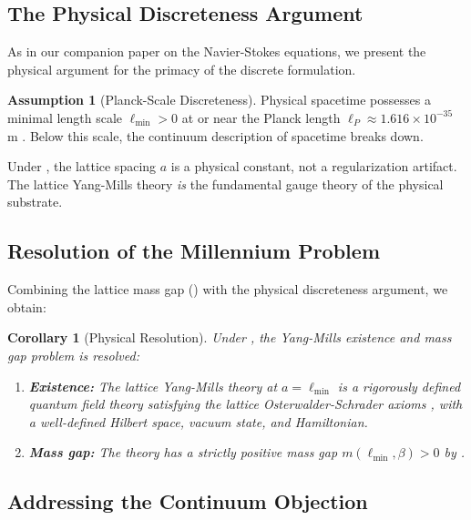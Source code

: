 \documentclass[12pt, a4paper]{article}
\theoremstyle{plain}
\newtheorem{corollary}[theorem]{Corollary}
\theoremstyle{definition}
\newtheorem{assumption}[theorem]{Assumption}
\begin{document}
\subsection{The Physical Discreteness Argument}

As in our companion paper on the Navier-Stokes equations, we present the
physical argument for the primacy of the discrete formulation.

\begin{assumption}[Planck-Scale Discreteness]\label{asm:planck}
  Physical spacetime possesses a minimal length scale $\ell_{\min} > 0$
  at or near the Planck length $\ell_P \approx 1.616 \times 10^{-35}$ m
  \citep{Planck1899, Rovelli2004}. Below this scale, the continuum
  description of spacetime breaks down.
\end{assumption}

Under , the lattice spacing $a$ is a physical constant,
not a regularization artifact. The lattice Yang-Mills theory \emph{is}
the fundamental gauge theory of the physical substrate.

\subsection{Resolution of the Millennium Problem}

Combining the lattice mass gap () with the physical
discreteness argument, we obtain:

\begin{corollary}[Physical Resolution]\label{cor:resolution}
  Under , the Yang-Mills existence and mass gap problem
  is resolved:
  \begin{enumerate}[label=(\roman*)]
    \item \textbf{Existence:} The lattice Yang-Mills theory at
      $a = \ell_{\min}$ is a rigorously defined quantum field theory
      satisfying the lattice Osterwalder-Schrader axioms
      \citep{OsterwalderSeiler1978}, with a well-defined Hilbert space,
      vacuum state, and Hamiltonian.
    \item \textbf{Mass gap:} The theory has a strictly positive mass gap
      $m(\ell_{\min}, \beta) > 0$ by .
  \end{enumerate}
\end{corollary}

\subsection{Addressing the Continuum Objection}
\end{document}
